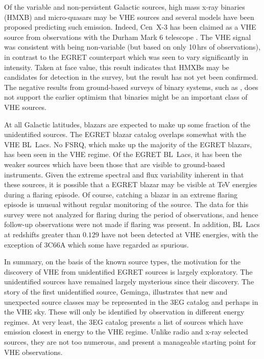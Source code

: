 Of the variable and non-persistent Galactic sources, high mass x-ray
binaries (HMXB) and micro-quasars may be VHE \Gray sources and several
models have been proposed predicting such emission. Indeed, Cen~X-3
has been claimed as a VHE source from observations with the Durham
Mark 6 telescope \citep{REF::CHADWICK::1998}. The VHE signal was
consistent with being non-variable (but based on only 10\,hrs of
observations), in contrast to the EGRET counterpart which was seen to
vary significantly in intensity. Taken at face value, this result
indicates that HMXBs may be candidates for detection in the survey,
but the result has not yet been confirmed.  The negative results from
ground-based surveys of binary systems, such as
\citet{REF::HALL::APJ2003}, does not support the earlier optimism that
binaries might be an important class of VHE sources.

At all Galactic latitudes, blazars are expected to make up some
fraction of the unidentified sources. The EGRET blazar catalog
overlaps somewhat with the VHE BL~Lacs. No FSRQ, which make up the
majority of the EGRET blazars, has been seen in the VHE regime. Of the
EGRET BL~Lacs, it has been the weaker sources which have been those
that are visible to ground-based instruments. Given the extreme
spectral and flux variability inherent in that these sources, it is
possible that a EGRET blazar may be visible at TeV energies during a
flaring episode. Of course, catching a blazar in an extreme flaring
episode is unusual without regular monitoring of the source. The data
for this survey were not analyzed for flaring during the period of
observations, and hence follow-up observations were not made if
flaring was present. In addition, BL~Lacs at redshifts greater than
$0.129$ have not been detected at VHE energies, with the exception of
3C66A which some have regarded as spurious.

In summary, on the basis of the known source types, the motivation for
the discovery of VHE \Grays from unidentified EGRET sources is largely
exploratory. The unidentified sources have remained largely mysterious
since their discovery. The story of the first unidentified source,
Geminga, illustrates that new and unexpected source classes may be
represented in the 3EG catalog and perhaps in the VHE sky. These will
only be identified by observation in different energy regimes.  At
very least, the 3EG catalog presents a list of sources which have
emission closest in energy to the VHE regime. Unlike radio and x-ray
selected sources, they are not too numerous, and present a manageable
starting point for VHE observations.
